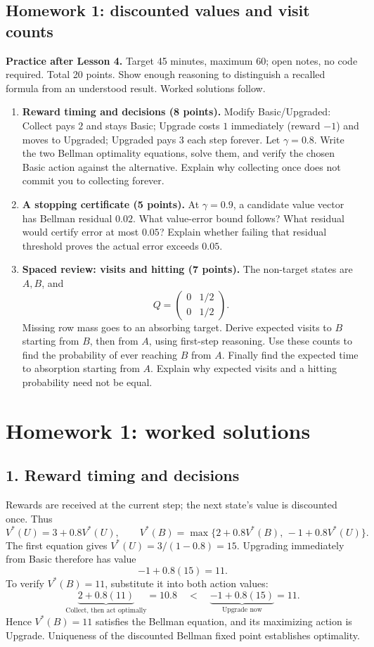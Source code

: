\documentclass[11pt]{article}
\theoremstyle{remark}\newtheorem{remark}[definition]{Remark}
\begin{document}
\clearpage
\subsection*{Homework 1: discounted values and visit counts}
\textbf{Practice after Lesson 4.} Target 45 minutes, maximum 60; open notes, no code required. Total 20 points. Show enough reasoning to distinguish a recalled formula from an understood result. Worked solutions follow.
\begin{enumerate}
\item \textbf{Reward timing and decisions (8 points).} Modify Basic/Upgraded: Collect pays $2$ and stays Basic; Upgrade costs $1$ immediately (reward $-1$) and moves to Upgraded; Upgraded pays $3$ each step forever. Let $\gamma=0.8$. Write the two Bellman optimality equations, solve them, and verify the chosen Basic action against the alternative. Explain why collecting once does not commit you to collecting forever.
\item \textbf{A stopping certificate (5 points).} At $\gamma=0.9$, a candidate value vector has Bellman residual $0.02$. What value-error bound follows? What residual would certify error at most $0.05$? Explain whether failing that residual threshold proves the actual error exceeds $0.05$.
\item \textbf{Spaced review: visits and hitting (7 points).} The non-target states are $A,B$, and
\[
Q=\begin{pmatrix}0&1/2\\0&1/2\end{pmatrix}.
\]
Missing row mass goes to an absorbing target. Derive expected visits to $B$ starting from $B$, then from $A$, using first-step reasoning. Use these counts to find the probability of ever reaching $B$ from $A$. Finally find the expected time to absorption starting from $A$. Explain why expected visits and a hitting probability need not be equal.
\end{enumerate}


\clearpage
{}
\section*{Homework 1: worked solutions}

\subsection*{1. Reward timing and decisions}
Rewards are received at the current step; the next state's value is discounted once. Thus
\[
V^*(U)=3+0.8V^*(U),\qquad
V^*(B)=\max\{2+0.8V^*(B),\,-1+0.8V^*(U)\}.
\]
The first equation gives $V^*(U)=3/(1-0.8)=15$. Upgrading immediately from Basic therefore has value
\[
-1+0.8(15)=11.
\]
To verify $V^*(B)=11$, substitute it into both action values:
\[
\underbrace{2+0.8(11)}_{\text{Collect, then act optimally}}=10.8
\quad<\quad
\underbrace{-1+0.8(15)}_{\text{Upgrade now}}=11.
\]
Hence $V^*(B)=11$ satisfies the Bellman equation, and its maximizing action is Upgrade. Uniqueness of the discounted Bellman fixed point establishes optimality.
\end{document}
